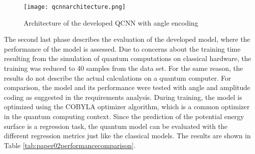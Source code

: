 \begin{figure}[h!]
    \centering
    \texttt{[image: qcnnarchitecture.png]}
    \caption[Architecture of the developed QCNN with angle encoding]{\label{img:qcnnarchitecture}{Architecture of the developed QCNN with angle encoding}}
\end{figure} 

The second last phase describes the evaluation of the developed model, where the performance of the model is assessed. Due to concerns about the training time resulting from the simulation of quantum computations on classical hardware, the training was reduced to 40 samples from the data set. For the same reason, the results do not describe the actual calculations on a quantum computer. For comparison, the model and its performance were tested with angle and amplitude coding as suggested in the requirements analysis. During training, the model is optimized using the COBYLA optimizer algorithm, which is a common optimizer in the quantum computing context. Since the prediction of the potential energy surface is a regression task, the quantum model can be evaluated with the different regression metrics just like the classical models. The results are shown in Table \ref{tab:paper02performancecomparison}. 

\begin{table}[h!]
    \centering
    \captionsetup{justification=centering}
       \caption[Comparison of performance metrics of the developed model with different data encoding strategies]{\label{tab:paper02performancecomparison} Comparison of performance metrics of the developed model with different data encoding strategies}
\end{table}

